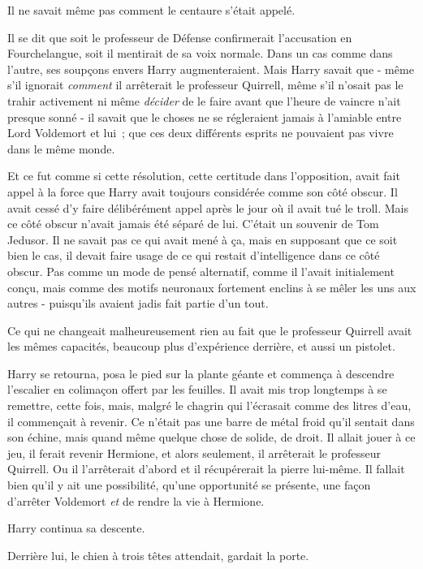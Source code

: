 Il ne savait même pas comment le centaure s'était appelé.

Il se dit que soit le professeur de Défense confirmerait l'accusation en Fourchelangue, soit il mentirait de sa voix normale. Dans un cas comme dans l'autre, ses soupçons envers Harry augmenteraient. Mais Harry savait que - même s'il ignorait \emph{comment} il arrêterait le professeur Quirrell, même s'il n'osait pas le trahir activement ni même \emph{décider} de le faire avant que l'heure de vaincre n'ait presque sonné - il savait que le choses ne se régleraient jamais à l'amiable entre Lord Voldemort et lui~; que ces deux différents esprits ne pouvaient pas vivre dans le même monde.

Et ce fut comme si cette résolution, cette certitude dans l'opposition, avait fait appel à la force que Harry avait toujours considérée comme son côté obscur. Il avait cessé d'y faire délibérément appel après le jour où il avait tué le troll. Mais ce côté obscur n'avait jamais été séparé de lui. C'était un souvenir de Tom Jedusor. Il ne savait pas ce qui avait mené à ça, mais en supposant que ce soit bien le cas, il devait faire usage de ce qui restait d'intelligence dans ce côté obscur. Pas comme un mode de pensé alternatif, comme il l'avait initialement conçu, mais comme des motifs neuronaux fortement enclins à se mêler les uns aux autres - puisqu'ils avaient jadis fait partie d'un tout.

Ce qui ne changeait malheureusement rien au fait que le professeur Quirrell avait les mêmes capacités, beaucoup plus d'expérience derrière, et aussi un pistolet.

Harry se retourna, posa le pied sur la plante géante et commença à descendre l'escalier en colimaçon offert par les feuilles. Il avait mis trop longtemps à se remettre, cette fois, mais, malgré le chagrin qui l'écrasait comme des litres d'eau, il commençait à revenir. Ce n'était pas une barre de métal froid qu'il sentait dans son échine, mais quand même quelque chose de solide, de droit. Il allait jouer à ce jeu, il ferait revenir Hermione, et alors seulement, il arrêterait le professeur Quirrell. Ou il l'arrêterait d'abord et il récupérerait la pierre lui-même. Il fallait bien qu'il y ait une possibilité, qu'une opportunité se présente, une façon d'arrêter Voldemort \emph{et} de rendre la vie à Hermione.

Harry continua sa descente.

Derrière lui, le chien à trois têtes attendait, gardait la porte. 

